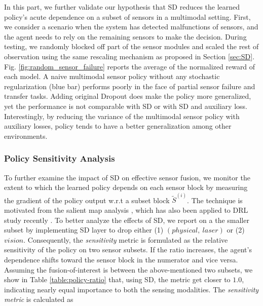\documentclass[../thesis.tex]{subfiles}
\begin{document}
In this part, we further validate our hypothesis that SD reduces the learned policy's acute dependence on a subset of sensors in a multimodal setting. First, we consider a scenario when the system has detected malfunctions of sensors, and the agent needs to rely on the remaining sensors to make the decision. During testing, we randomly blocked off part of the sensor modules and scaled the rest of observation using the same rescaling mechanism as proposed in Section \ref{sec:SD}. Fig. \ref{fig:random_sensor_failure} reports the average of the normalized reward of each model. A naive multimodal sensor policy without any stochastic regularization (blue bar) performs poorly in the face of partial sensor failure and transfer tasks. Adding original Dropout does make the policy more generalized, yet the performance is not comparable with SD or with SD and auxiliary loss. Interestingly, by reducing the variance of the multimodal sensor policy with auxiliary losses, policy tends to have a better generalization among other environments.
 
\subsubsection{Policy Sensitivity Analysis}
To further examine the impact of SD on effective sensor fusion, we monitor the extent to which the learned policy depends on each sensor block by measuring the gradient of the policy output w.r.t a subset block $\tilde{S}^{(i)}$. The technique is motivated from the salient map analysis \cite{simonyan2013deep}, which has also been applied to DRL study recently \cite{WangFL15}.
To better analyze the effects of SD, we report on a the smaller subset by implementing SD layer to drop either (1) $(physical,~ laser)$ or (2) $vision$. Consequently, the \emph{sensitivity} metric is formulated as the relative sensitivity of the policy on two sensor subsets. If the ratio increases, the agent's dependence shifts toward the sensor block in the numerator and vice versa. Assuming the fusion-of-interest is between the above-mentioned two subsets, we show in Table \ref{table:policy-ratio} that, using SD, the metric get closer to $1.0$, indicating nearly equal importance to both the sensing modalities. The \textit{sensitivity metric} is calculated as
 
\end{document}
